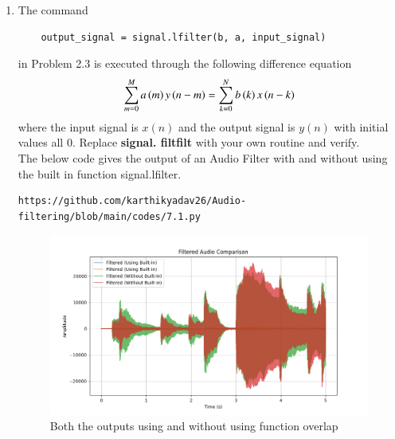 \documentclass[journal,12pt,twocolumn]{IEEEtran}
\theoremstyle{remark}
\renewcommand\thesection{\arabic{section}}
\begin{document}
\begin{enumerate}[label=\thesection.\arabic*]
\item
The command
\begin{lstlisting}
	output_signal = signal.lfilter(b, a, input_signal)
	\end{lstlisting}
in Problem 2.3 is executed through the following difference equation
\begin{equation}
\label{eq:iir_filter_gen}
 \sum _{m=0}^{M}a\left(m\right)y\left(n-m\right)=\sum _{k=0}^{N}b\left(k\right)x\left(n-k\right) 
\end{equation}
%
where the input signal is $x(n)$ and the output signal is $y(n)$ with initial values all 0. Replace
\textbf{signal. filtfilt} with your own routine and verify.\\

\solution The below code gives the output of an Audio Filter with and without using the built in function signal.lfilter.
\begin{lstlisting}
https://github.com/karthikyadav26/Audio-filtering/blob/main/codes/7.1.py
\end{lstlisting}
\begin{figure}[htbp]
\centering
\includegraphics[width=\columnwidth]{figs/compare.png}
\caption{Both the outputs using and without using function overlap}
\label{fig:6.1}
\end{figure}


\end{enumerate}
\end{document}
